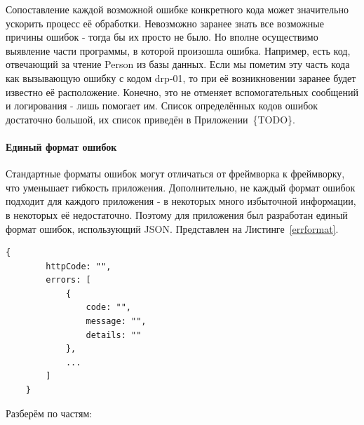 \documentclass[a4paper,article]{article}
\begin{document}
    Сопоставление каждой возможной ошибке конкретного кода может значительно ускорить процесс её обработки. Невозможно заранее знать все возможные причины ошибок - тогда бы их просто не было. Но вполне осуществимо выявление части программы, в которой произошла ошибка. Например, есть код, отвечающий за чтение Person из базы данных. Если мы пометим эту часть кода как вызывающую ошибку с кодом drp-01, то при её возникновении заранее будет известно её расположение. Конечно, это не отменяет вспомогательных сообщений и логирования - лишь помогает им. Список определённых кодов ошибок достаточно большой, их список приведён в Приложении~\{TODO\}.

    \paragraph{Единый формат ошибок}

    Стандартные форматы ошибок могут отличаться от фреймворка к фреймворку, что уменьшает гибкость приложения. Дополнительно, не каждый формат ошибок подходит для каждого приложения - в некоторых много избыточной информации, в некоторых её недостаточно. Поэтому для приложения был разработан единый формат ошибок, использующий JSON. Представлен на Листинге~\ref{errformat}.

    \begin{lstlisting}[label=errformat,caption=Формат ошибок]
    {
        httpCode: "",
        errors: [
            {
                code: "",
                message: "",
                details: ""
            },
            ...
        ]
    }
    \end{lstlisting}

    Разберём по частям:
\end{document}
